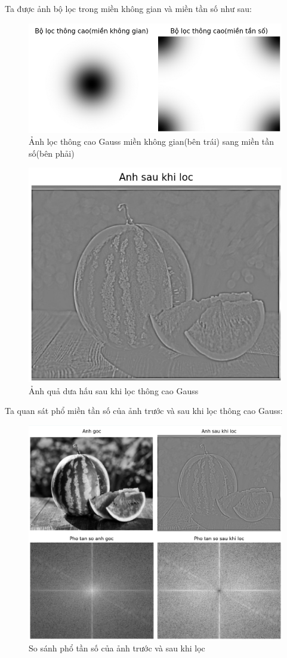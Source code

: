 \documentclass[12pt,a4paper]{report}
\numberwithin{equation}{section}
\theoremstyle{definition} %
\begin{document}
Ta được ảnh bộ lọc trong miền không gian và miền tần số như sau: 
\begin{figure}[H]
\centering
\includegraphics[width=0.8\linewidth]{img/GaussHP-KG-TS.png}
\caption{Ảnh lọc thông cao Gauss miền không gian(bên trái) sang miền tần số(bên phải)}
\label{fig133}
\end{figure}

\begin{figure}[H]
\centering
\includegraphics[width=0.6\linewidth]{img/SauLocGaussHP.png}
\caption{Ảnh quả dưa hấu sau khi lọc thông cao Gauss}
\label{fig134}
\end{figure}
Ta quan sát phổ miền tần số của ảnh trước và sau khi lọc thông cao Gauss: 
\begin{figure}[H]
\centering
\includegraphics[width=0.8\linewidth]{img/Hinh1-14.png}
\caption{So sánh phổ tần số của ảnh trước và sau khi lọc}
\label{fig135}
\end{figure}
\end{document}
